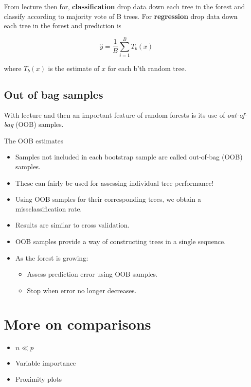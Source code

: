 From lecture \cite[p.~37]{lecture9} then for, \textbf{classification} drop data down each tree in the forest and classify according to majority vote of B trees. For \textbf{regression} drop data down each tree in the forest and prediction is

\[
    \hat{y} = \frac{1}{B} \sum_{i=1}^{B} T_b (x)
\] 

where $T_b (x)$ is the estimate of $x$ for each b'th random tree.

\subsection{Out of bag samples}

With lecture \cite[p.~38]{lecture9} and \cite[p.~592]{friedman2016elements} then an important feature of random forests is its use of \textit{out-of-bag} (OOB) samples.

The OOB estimates

\begin{itemize}
  \item Samples not included in each bootstrap sample are called out-of-bag (OOB) samples.
  \item These can fairly be used for assessing individual tree performance!
  \item Using OOB samples for their corresponding trees, we obtain a missclassification rate.
  \item Results are similar to cross validation.
  \item OOB samples provide a way of constructing trees in a single sequence.
    \item As the forest is growing:
    \begin{itemize}
      \item Assess prediction error using OOB samples.
      \item Stop when error no longer decreases.
    \end{itemize}
\end{itemize}

\section{More on comparisons}

\begin{itemize}
  \item $n \ll p$
  \item Variable importance \cite[p.~593]{friedman2016elements}
  \item Proximity plots \cite[p.~595]{friedman2016elements}
\end{itemize}

